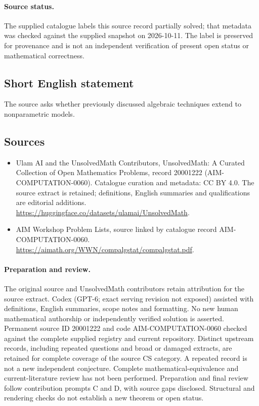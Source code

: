 \documentclass[11pt]{article}
\begin{document}
\paragraph{Source status.}
The supplied catalogue labels this source record partially solved; that metadata was checked against the supplied snapshot on 2026-10-11. The label is preserved for provenance and is not an independent verification of present open status or mathematical correctness.
\subsection{Short English statement}
The source asks whether previously discussed algebraic techniques extend to nonparametric models.
\subsection{Sources}
\begin{itemize}
\item[\hypertarget{source:20001222:1}{S1}] Ulam AI and the UnsolvedMath Contributors, UnsolvedMath: A Curated Collection of Open Mathematics Problems, record 20001222 (AIM-COMPUTATION-0060). Catalogue curation and metadata: CC BY 4.0. The source extract is retained; definitions, English summaries and qualifications are editorial additions.
\url{https://huggingface.co/datasets/ulamai/UnsolvedMath}.
\item[\hypertarget{source:20001222:2}{S2}] AIM Workshop Problem Lists, source linked by catalogue record AIM-COMPUTATION-0060.
\url{https://aimath.org/WWN/compalgstat/compalgstat.pdf}.
\end{itemize}
\paragraph{Preparation and review.}
The original source and UnsolvedMath contributors retain attribution for the source extract. Codex (GPT-6; exact serving revision not exposed) assisted with definitions, English summaries, scope notes and formatting. No new human mathematical authorship or independently verified solution is asserted. Permanent source ID 20001222 and code AIM-COMPUTATION-0060 checked against the complete supplied registry and current repository. Distinct upstream records, including repeated questions and broad or damaged extracts, are retained for complete coverage of the source CS category. A repeated record is not a new independent conjecture. Complete mathematical-equivalence and current-literature review has not been performed. Preparation and final review follow contribution prompts C and D, with source gaps disclosed. Structural and rendering checks do not establish a new theorem or open status.
\label{end:20001222}
\end{document}

